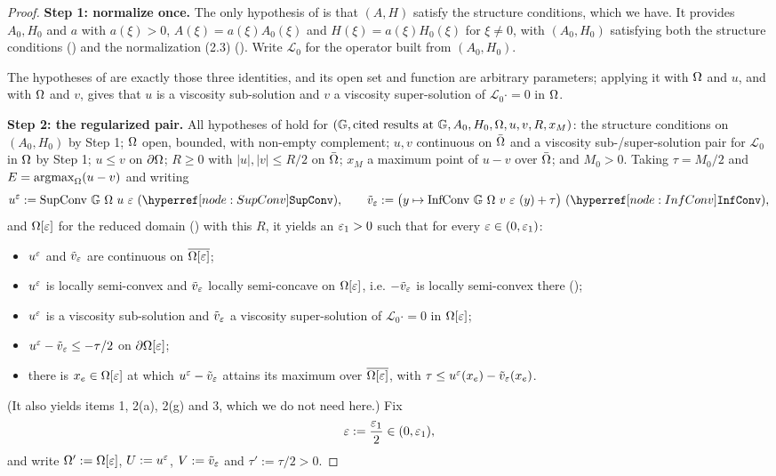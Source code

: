 \begin{proof}
\medskip\noindent\textbf{Step 1: normalize once.} The only hypothesis of
 is that $(A,H)$ satisfy the structure conditions, which we
have. It provides $A_0,H_0$ and $a$ with $a(\xi)>0$, $A(\xi)=a(\xi)A_0(\xi)$ and
$H(\xi)=a(\xi)H_0(\xi)$ for $\xi\ne0$, with $(A_0,H_0)$ satisfying both the structure
conditions () and the normalization (2.3)
(). Write $\mathcal L_0$ for the operator built from $(A_0,H_0)$.

The hypotheses of  are exactly those three
identities, and its open set and function are arbitrary parameters; applying it with $\Omega$
and $u$, and with $\Omega$ and $v$, gives that $u$ is a viscosity sub-solution and $v$ a
viscosity super-solution of $\mathcal L_0\cdot=0$ in $\Omega$.

\medskip\noindent\textbf{Step 2: the regularized pair.} All hypotheses of
 hold for
$(\mathbb G,\text{cited results at }\mathbb G,A_0,H_0,\Omega,u,v,R,x_M)$: the structure
conditions on
$(A_0,H_0)$ by Step 1; $\Omega$ open, bounded, with non-empty complement; $u,v$ continuous on
$\bar{\Omega}$ and a viscosity sub-/super-solution pair for $\mathcal L_0$ in $\Omega$ by Step 1;
$u\le v$ on $\partial\Omega$; $R\ge0$ with $|u|,|v|\le R/2$ on $\bar{\Omega}$; $x_M$ a maximum point of
$u-v$ over $\bar{\Omega}$; and $M_0>0$. Taking $\tau=M_0/2$ and
$E=\operatorname*{argmax}_\Omega(u-v)$ and writing
\[
 u^{\eps}:=\mathrm{SupConv}\ \mathbb G\ \Om\ u\ \eps\ (\noderef{SupConv}),\qquad
 \tilde v_{\eps}:=\big(y\mapsto\mathrm{InfConv}\ \mathbb G\ \Om\ v\ \eps\ (y)+\tau\big)
 \ (\noderef{InfConv}),
\]
and $\Omega[\varepsilon]$ for the reduced domain () with this $R$, it yields an
$\varepsilon_1>0$ such that for every $\varepsilon\in(0,\varepsilon_1)$:
\begin{itemize}
\item[(b)] $u^{\varepsilon}$ and $\tilde v_{\varepsilon}$ are continuous on $\overline{\Omega[\varepsilon]}$;
\item[(c)] $u^{\varepsilon}$ is locally semi-convex and $\tilde v_{\varepsilon}$ locally semi-concave on
  $\Omega[\varepsilon]$, i.e. $-\tilde v_{\varepsilon}$ is locally semi-convex there
  ();
\item[(d)] $u^{\varepsilon}$ is a viscosity sub-solution and $\tilde v_{\varepsilon}$ a viscosity
  super-solution of $\mathcal L_0\cdot=0$ in $\Omega[\varepsilon]$;
\item[(e)] $u^{\varepsilon}-\tilde v_{\varepsilon}\le-\tau/2$ on $\partial\Omega[\varepsilon]$;
\item[(f)] there is $x_e\in\Omega[\varepsilon]$ at which $u^{\varepsilon}-\tilde v_{\varepsilon}$ attains its maximum
  over $\overline{\Omega[\varepsilon]}$, with $\tau\le u^{\varepsilon}(x_e)-\tilde v_{\varepsilon}(x_e)$.
\end{itemize}
(It also yields items 1, 2(a), 2(g) and 3, which we do not need here.) Fix
\[
 \varepsilon:=\frac{\varepsilon_1}2\in(0,\varepsilon_1),
\]
and write $\Omega':=\Omega[\varepsilon]$, $U:=u^{\varepsilon}$, $V:=\tilde v_{\varepsilon}$ and
$\tau':=\tau/2>0$.


\end{proof}
